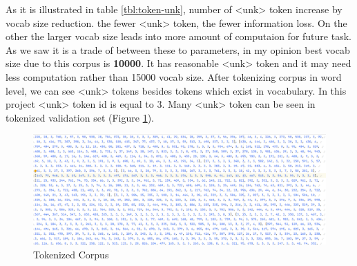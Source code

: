 As it is illustrated in table \ref{tbl:token-unk}, number of <unk> token increase by vocab size reduction. the fewer <unk> token, the fewer information loss. On the other the larger vocab size leads into more amount of computaion for future task. As we saw it is a trade of between these to parameters, in my opinion best vocab size due to this corpus is \textbf{10000}. It has reasonable <unk> token and it may need less computation rather than 15000 vocab size.
\newline
After tokenizing corpus in word level, we can see <unk> tokens besides tokens which exist in vocabulary. In this project <unk> token id is equal to 3. Many <unk> token can be seen in tokenized validation set (Figure \ref{fig:unkrep}).

\begin{figure}[h]
	\centering
	\includegraphics[width=15cm]{images/unkrep.png}
	\caption{Tokenized Corpus}
	\label{fig:unkrep}
\end{figure}

